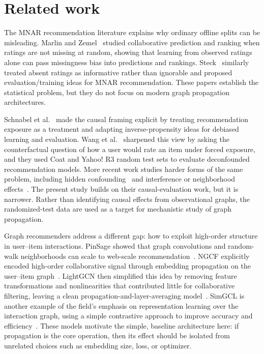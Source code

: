 \documentclass[10pt]{article}
\begin{document}
\section{Related work}
\label{sec:related}

The MNAR recommendation literature explains why ordinary offline splits can be misleading. Marlin and Zemel~\citep{marlin2009} studied collaborative prediction and ranking when ratings are not missing at random, showing that learning from observed ratings alone can pass missingness bias into predictions and rankings. Steck~\citep{steck2010} similarly treated absent ratings as informative rather than ignorable and proposed evaluation/training ideas for MNAR recommendation. These papers establish the statistical problem, but they do not focus on modern graph propagation architectures.

Schnabel et al.~\citep{schnabel2016} made the causal framing explicit by treating recommendation exposure as a treatment and adapting inverse-propensity ideas for debiased learning and evaluation. Wang et al.~\citep{wang2020} sharpened this view by asking the counterfactual question of how a user would rate an item under forced exposure, and they used Coat and Yahoo! R3 random test sets to evaluate deconfounded recommendation models. More recent work studies harder forms of the same problem, including hidden confounding~\citep{zhang2023,li2023} and interference or neighborhood effects~\citep{li2024}. The present study builds on their causal-evaluation work, but it is narrower. Rather than identifying causal effects from observational graphs, the randomized-test data are used as a target for mechanistic study of graph propagation.

Graph recommenders address a different gap: how to exploit high-order structure in user--item interactions. PinSage showed that graph convolutions and random-walk neighborhoods can scale to web-scale recommendation~\citep{ying2018}. NGCF explicitly encoded high-order collaborative signal through embedding propagation on the user--item graph~\citep{wang2019}. LightGCN then simplified this idea by removing feature transformations and nonlinearities that contributed little for collaborative filtering, leaving a clean propagation-and-layer-averaging model~\citep{he2020}. SimGCL is another example of the field's emphasis on representation learning over the interaction graph, using a simple contrastive approach to improve accuracy and efficiency~\citep{yu2022}. These models motivate the simple, baseline architecture here: if propagation is the core operation, then its effect should be isolated from unrelated choices such as embedding size, loss, or optimizer.
\end{document}
